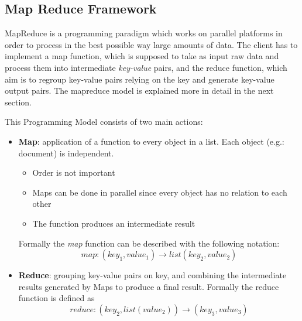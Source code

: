 \documentclass[a4paper,11pt, twoside]{article}
\begin{document}
		

	\subsection{Map Reduce Framework}
		MapReduce is a programming paradigm which works on parallel platforms in order to process in the best possible way large amounts of data. The client has to implement a map function, which is supposed to take as input raw data and process them into intermediate \textit{key-value} pairs, and the reduce function, which aim is to regroup key-value pairs relying on the key and generate key-value output pairs. The mapreduce model is explained more in detail in the next section.
		
		\bigskip


		\noindent
		This Programming Model consists of two main actions:
		\begin{itemize}
			\item \textbf{Map}: application of a function to every object in a list. Each object (e.g.: document) is independent.
			\begin{itemize}
				\item Order is not important
				\item Maps can be done in parallel since every object has no relation to each other
				\item The function produces an intermediate result
			\end{itemize}
			
			Formally the \textit{map} function can be described with the following notation: \[ map:(key_1, value_1) \to list(key_2, value_2) \]
			\item \textbf{Reduce}: grouping key-value pairs on key, and combining the intermediate results generated by Maps to produce a final result. Formally the reduce function is defined as \[ reduce:(key_2, list(value_2)) \to (key_3, value_3)  \]
		\end{itemize}
\end{document}
